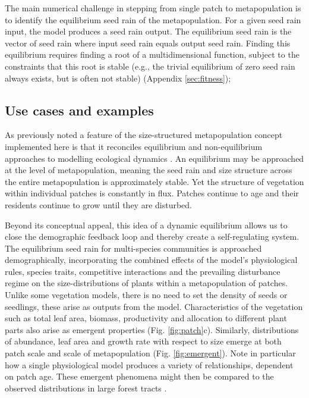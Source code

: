 \documentclass[a4paper,11pt]{article}
\begin{document}
The main numerical challenge in stepping from single patch
to metapopulation is to identify the equilibrium seed rain of the
metapopulation. For a given seed rain input, the model produces a seed rain output. 
The equilibrium seed rain is the vector of seed rain
where input seed rain equals output seed rain. Finding this equilibrium
requires finding a root of a multidimensional function, subject to the
constraints that this root is stable (e.g., the trivial equilibrium of
zero seed rain always exists, but is often not stable) (Appendix \ref{sec:fitness});

\subsection{Use cases and examples}

As previously noted \citep{Kohyama-1993, Moorcroft-2001, Falster-2011} a
feature of the size-structured metapopulation concept implemented here
is that it reconciles equilibrium and non-equilibrium approaches to
modelling ecological dynamics
\citep{Levin-1974, Bormann-1979, Connell-1978, Coomes-2007}. An
equilibrium may be approached at the level of metapopulation, meaning
the seed rain and size structure across the entire metapopulation is
approximately stable. Yet the structure of vegetation within individual
patches is constantly in flux. Patches continue to age and their
residents continue to grow until they are disturbed.

Beyond its conceptual appeal, this idea of a dynamic equilibrium allows
us to close the demographic feedback loop and thereby create a
self-regulating system. The equilibrium seed rain for multi-species
communities is approached demographically, incorporating the combined
effects of the model's physiological rules, species traits, competitive
interactions and the prevailing disturbance regime on the
size-distributions of plants within a metapopulation of patches. Unlike
some vegetation models, there is no need to set the density of seeds or
seedlings, these arise as outputs from the model. Characteristics of the
vegetation such as total leaf area, biomass, productivity and allocation
to different plant parts also arise as emergent properties (Fig.
\ref{fig:patch}c). Similarly, distributions of abundance, leaf area and
growth rate with respect to size emerge at both patch scale and scale of
metapopulation (Fig. \ref{fig:emergent}). Note in particular how a single
physiological model produces a variety of relationships, dependent on patch
age. These emergent phenomena might then be compared to the observed
distributions in large forest tracts \citep{Muller-2006}.
\end{document}
